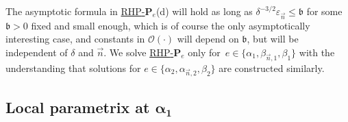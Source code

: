 \documentclass[10pt,a4paper]{amsart}
\numberwithin{equation}{section}
\newcommand{\n}{{\vec n}}
\newcommand{\rhp} {\textnormal{RHP}-${\boldsymbol P}$}
\begin{document}
The asymptotic formula in \hyperref[rhp]{\rhp$_e$}(d) will hold as long as $ \delta^{-3/2}\varepsilon_\n \leq \mathfrak b $ for some $ {\mathfrak b>0 }$ fixed and small enough, which is of course the only asymptotically interesting case, and constants in $ \boldsymbol{\mathcal O}(\cdot) $ will depend on $ \mathfrak b $, but will be independent of $ \delta $ and $ \n $. We solve \hyperref[rhp]{\rhp$_e$} only for~$ e\in\{\alpha_1,\beta_{\n,1},\beta_1\} $ with the understanding that solutions for $ e\in \{ \alpha_2,\alpha_{\n,2},\beta_2 \} $ are constructed similarly.


\subsection[Local parametrix at alpha\_1]{Local parametrix at $ \boldsymbol{\alpha_1 }$}
\end{document}
